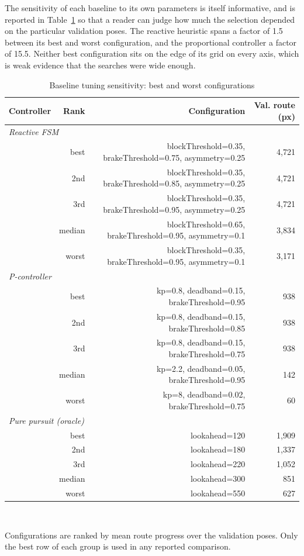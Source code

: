 \documentclass[conference]{IEEEtran}
\begin{document}
The sensitivity of each baseline to its own parameters is itself informative, and is reported in Table~\ref{tab:sensitivity} so that a reader can judge how much the selection depended on the particular validation poses. The reactive heuristic spans a factor of 1.5 between its best and worst configuration, and the proportional controller a factor of 15.5. Neither best configuration sits on the edge of its grid on every axis, which is weak evidence that the searches were wide enough.

\begin{table}[!t]
\caption{Baseline tuning sensitivity: best and worst configurations}
\label{tab:sensitivity}
\centering
\footnotesize
\begin{tabular}{lrrr}
\toprule
Controller & Rank & Configuration & Val. route (px) \\
\midrule
\multicolumn{4}{l}{\emph{Reactive FSM}} \\
 & best & blockThreshold=0.35, brakeThreshold=0.75, asymmetry=0.25 & 4,721 \\
 & 2nd & blockThreshold=0.35, brakeThreshold=0.85, asymmetry=0.25 & 4,721 \\
 & 3rd & blockThreshold=0.35, brakeThreshold=0.95, asymmetry=0.25 & 4,721 \\
 & median & blockThreshold=0.65, brakeThreshold=0.95, asymmetry=0.1 & 3,834 \\
 & worst & blockThreshold=0.35, brakeThreshold=0.95, asymmetry=0.1 & 3,171 \\
\multicolumn{4}{l}{\emph{P-controller}} \\
 & best & kp=0.8, deadband=0.15, brakeThreshold=0.95 & 938 \\
 & 2nd & kp=0.8, deadband=0.15, brakeThreshold=0.85 & 938 \\
 & 3rd & kp=0.8, deadband=0.15, brakeThreshold=0.75 & 938 \\
 & median & kp=2.2, deadband=0.05, brakeThreshold=0.95 & 142 \\
 & worst & kp=8, deadband=0.02, brakeThreshold=0.75 & 60 \\
\multicolumn{4}{l}{\emph{Pure pursuit (oracle)}} \\
 & best & lookahead=120 & 1,909 \\
 & 2nd & lookahead=180 & 1,337 \\
 & 3rd & lookahead=220 & 1,052 \\
 & median & lookahead=300 & 851 \\
 & worst & lookahead=550 & 627 \\
\bottomrule
\end{tabular}
\\[2pt]\parbox{\linewidth}{\scriptsize Configurations are ranked by mean route progress over the validation poses. Only the best row of each group is used in any reported comparison.}
\end{table}
\end{document}
